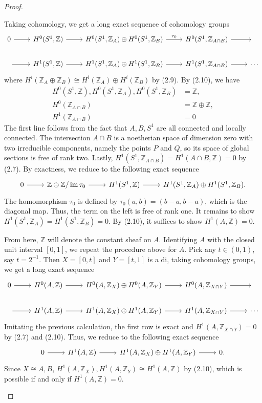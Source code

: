 \documentclass{article}
\newcommand{\Z}{\mathbb{Z}}
\DeclareMathOperator{\im}{im}
\begin{document}
\begin{enumerate} [label=\textbf{\arabic*.}, leftmargin=0em]
\begin{proof}
\begin{itemize} [leftmargin=0cm]
Taking cohomology, we get a long exact sequence of cohomology groups
\[ \begin{tikzcd}
    0 \arrow[r]  & H^0(S^1, \Z) \arrow[r] & H^0(S^1, \Z_A) \oplus H^0(S^1, \Z_B) \arrow[r, "\tau_0"] & H^0(S^1, \Z_{A \cap B}) \arrow[r] & {}     \\
    {} \arrow[r] & H^1(S^1, \Z) \arrow[r] & H^1(S^1, \Z_A) \oplus H^1(S^1, \Z_B) \arrow[r] & H^1(S^1, \Z_{A \cap B}) \arrow[r] & \cdots
    \end{tikzcd} \]
where $H^i(\Z_A \oplus \Z_B) \cong H^i(\Z_A) \oplus H^i(\Z_B)$ by (2.9). By (2.10), we have
\begin{align*}
    H^0(S^1, \Z), H^0(S^1, \Z_A), H^0(S^1, \Z_B) & = \Z, \\
    H^0(\Z_{A \cap B}) & = \Z \oplus \Z, \\
    H^1(\Z_{A \cap B}) & = 0
\end{align*}
The first line follows from the fact that $A, B , S^1$ are all connected and locally connected. The intersection $A \cap B$ is a noetherian space of dimension zero with two irreducible components, namely the points $P$ and $Q$, so its space of global sections is free of rank two. Lastly, $H^1(S^1, \Z_{A \cap B}) = H^1(A \cap B, \Z) = 0$ by (2.7). By exactness, we reduce to the following exact sequence
\[ \begin{tikzcd}
    0 \arrow[r] & \Z \oplus \Z / \im{\tau_0} \arrow[r] & H^1(S^1,\Z) \arrow[r] & H^1(S^1, \Z_A) \oplus H^1(S^1, \Z_B).
    \end{tikzcd} \]
The homomorphism $\tau_0$ is defined by $\tau_0(a, b) = (b - a, b - a)$, which is the diagonal map. Thus, the term on the left is free of rank one. It remains to show $H^1(S^1, \Z_A) = H^1(S^1, \Z_B) = 0$. By (2.10), it suffices to show $H^1(A, \Z) = 0$.

From here, $\Z$ will denote the constant sheaf on $A$. Identifying $A$ with the closed unit interval $[0, 1]$, we repeat the procedure above for $A$. Pick any $t \in (0, 1)$, say $t = 2^{-1}$. Then $X = [0, t]$ and $Y = [t, 1]$ is a di, taking cohomology groups, we get a long exact sequence
\[ \begin{tikzcd}
    0 \arrow[r]  & H^0(A, \Z) \arrow[r] & H^0(A, \Z_X) \oplus H^0(A, \Z_Y) \arrow[r] & H^0(A, \Z_{X \cap Y}) \arrow[r] & {}     \\
    {} \arrow[r] & H^1(A, \Z) \arrow[r] & H^1(A, \Z_X) \oplus H^1(A, \Z_Y) \arrow[r] & H^1(A, \Z_{X \cap Y}) \arrow[r] & \cdots
    \end{tikzcd} \]
Imitating the previous calculation, the first row is exact and $H^1(A, \Z_{X \cap Y}) = 0$ by (2.7) and (2.10). Thus, we reduce to the following exact sequence
\[ \begin{tikzcd}
    0 \arrow[r] & H^1(A, \Z) \arrow[r] & H^1(A,\Z_X) \oplus H^1(A, \Z_Y) \arrow[r] & 0.
    \end{tikzcd} \]
Since $X \cong A, B$, $H^1(A, \Z_X), H^1(A, \Z_Y) \cong H^1(A, \Z)$ by (2.10), which is possible if and only if $H^1(A, \Z) = 0$.


\end{itemize}
\end{proof}
\end{enumerate}
\end{document}
